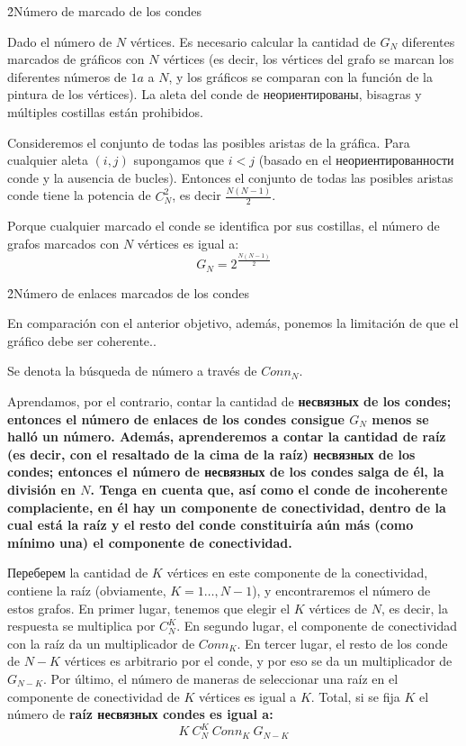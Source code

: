 \h2{Número de marcado de los condes}

Dado el número de $N$ vértices. Es necesario calcular la cantidad de $G_N$ diferentes marcados de gráficos con $N$ vértices (es decir, los vértices del grafo se marcan los diferentes números de $1 a$ a $N$, y los gráficos se comparan con la función de la pintura de los vértices). La aleta del conde de неориентированы, bisagras y múltiples costillas están prohibidos.

Consideremos el conjunto de todas las posibles aristas de la gráfica. Para cualquier aleta $(i,j)$ supongamos que $i<j$ (basado en el неориентированности conde y la ausencia de bucles). Entonces el conjunto de todas las posibles aristas conde tiene la potencia de $C_N^2$, es decir $\frac{ N (N-1) }{ 2 }$.

Porque cualquier marcado el conde se identifica por sus costillas, el número de grafos marcados con $N$ vértices es igual a:
$$ G_N = 2^{ \frac{ N (N-1) }{ 2 } } $$

\h2{Número de enlaces marcados de los condes}

En comparación con el anterior objetivo, además, ponemos la limitación de que el gráfico debe ser coherente..

Se denota la búsqueda de número a través de $Conn_N$.

Aprendamos, por el contrario, contar la cantidad de \bf{несвязных} de los condes; entonces el número de enlaces de los condes consigue $G_N$ menos se halló un número. Además, aprenderemos a contar la cantidad de \bf{raíz} (es decir, con el resaltado de la cima de la raíz) \bf{несвязных de los condes}; entonces el número de несвязных de los condes salga de él, la división en $N$. Tenga en cuenta que, así como el conde de incoherente complaciente, en él hay un componente de conectividad, dentro de la cual está la raíz y el resto del conde constituiría aún más (como mínimo una) el componente de conectividad.

Переберем la cantidad de $K$ vértices en este componente de la conectividad, contiene la raíz (obviamente, $K = 1 \ldots, N-1$), y encontraremos el número de estos grafos. En primer lugar, tenemos que elegir el $K$ vértices de $N$, es decir, la respuesta se multiplica por $C_N^K$. En segundo lugar, el componente de conectividad con la raíz da un multiplicador de $Conn_K$. En tercer lugar, el resto de los conde de $N-K$ vértices es arbitrario por el conde, y por eso se da un multiplicador de $G_{N-K}$. Por último, el número de maneras de seleccionar una raíz en el componente de conectividad de $K$ vértices es igual a $K$. Total, si se fija $K$ el número de \bf{raíz несвязных} condes es igual a:
$$ K\ C_N^K\ Conn_K\ G_{N-K} $$

